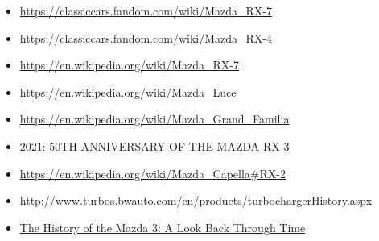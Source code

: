 \documentclass[a4paper, 12pt]{article}
\begin{document}
\begin{itemize}
    \item \url{https://classiccars.fandom.com/wiki/Mazda_RX-7}
    \item \url{https://classiccars.fandom.com/wiki/Mazda_RX-4}
    \item \url{https://en.wikipedia.org/wiki/Mazda_RX-7}
    \item \url{https://en.wikipedia.org/wiki/Mazda_Luce}
    \item \url{https://en.wikipedia.org/wiki/Mazda_Grand_Familia}
    \item \href{https://www.mazda.co.uk/why-mazda/news-and-events/mazda-news/articles/2021-50th-anniversary-of-the-mazda-rx-3/}{2021: 50TH ANNIVERSARY OF THE MAZDA RX-3}
    \item \url{https://en.wikipedia.org/wiki/Mazda_Capella#RX-2}
    \item \url{http://www.turbos.bwauto.com/en/products/turbochargerHistory.aspx}
    \item \href{https://www.edmunds.com/car-reviews/features/the-history-of-the-mazda-3-a-look-back-through-time.html}{The History of the Mazda 3: A Look Back Through Time}
\end{itemize}
\end{document}
